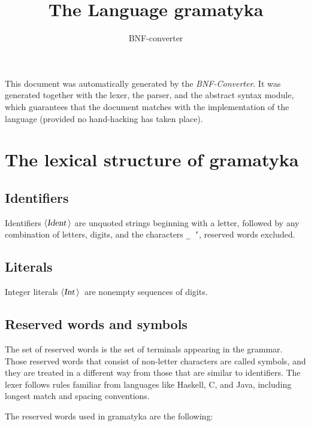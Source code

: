\documentclass[a4paper,11pt]{article}
\author{BNF-converter}
\title{The Language gramatyka}
\begin{document}
\maketitle

\newcommand{\emptyP}{\mbox{$\epsilon$}}
\newcommand{\terminal}[1]{\mbox{{\texttt {#1}}}}
\newcommand{\nonterminal}[1]{\mbox{$\langle \mbox{{\sl #1 }} \! \rangle$}}
\newcommand{\arrow}{\mbox{::=}}
\newcommand{\delimit}{\mbox{$|$}}
\newcommand{\reserved}[1]{\mbox{{\texttt {#1}}}}
\newcommand{\literal}[1]{\mbox{{\texttt {#1}}}}
\newcommand{\symb}[1]{\mbox{{\texttt {#1}}}}

This document was automatically generated by the {\em BNF-Converter}. It was generated together with the lexer, the parser, and the abstract syntax module, which guarantees that the document matches with the implementation of the language (provided no hand-hacking has taken place).

\section*{The lexical structure of gramatyka}
\subsection*{Identifiers}
Identifiers \nonterminal{Ident} are unquoted strings beginning with a letter,
followed by any combination of letters, digits, and the characters {\tt \_ '},
reserved words excluded.


\subsection*{Literals}
Integer literals \nonterminal{Int}\ are nonempty sequences of digits.




\subsection*{Reserved words and symbols}
The set of reserved words is the set of terminals appearing in the grammar. Those reserved words that consist of non-letter characters are called symbols, and they are treated in a different way from those that are similar to identifiers. The lexer follows rules familiar from languages like Haskell, C, and Java, including longest match and spacing conventions.

The reserved words used in gramatyka are the following: \\
\end{document}
